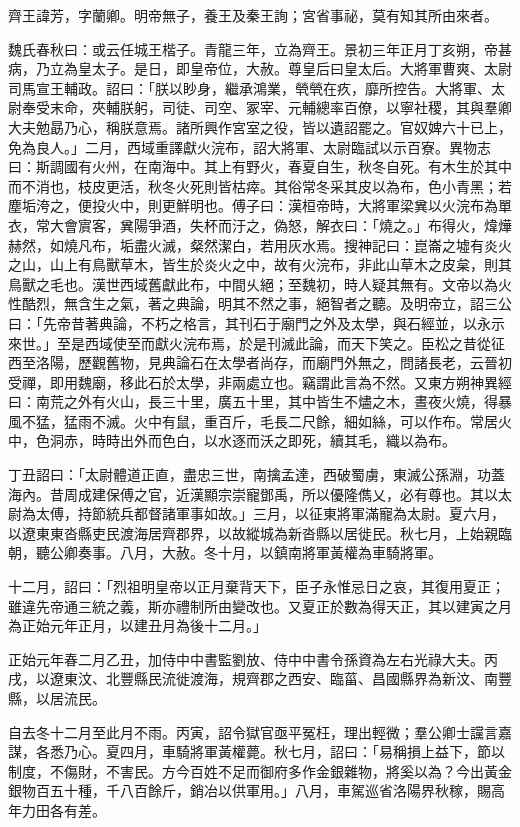 
\begin{pinyinscope}
齊王諱芳，字蘭卿。明帝無子，養王及秦王詢；宮省事祕，莫有知其所由來者。

魏氏春秋曰：或云任城王楷子。青龍三年，立為齊王。景初三年正月丁亥朔，帝甚病，乃立為皇太子。是日，即皇帝位，大赦。尊皇后曰皇太后。大將軍曹爽、太尉司馬宣王輔政。詔曰：「朕以眇身，繼承鴻業，煢煢在疚，靡所控告。大將軍、太尉奉受末命，夾輔朕躬，司徒、司空、冢宰、元輔總率百僚，以寧社稷，其與羣卿大夫勉勗乃心，稱朕意焉。諸所興作宮室之役，皆以遺詔罷之。官奴婢六十已上，免為良人。」二月，西域重譯獻火浣布，詔大將軍、太尉臨試以示百寮。異物志曰：斯調國有火州，在南海中。其上有野火，春夏自生，秋冬自死。有木生於其中而不消也，枝皮更活，秋冬火死則皆枯瘁。其俗常冬采其皮以為布，色小青黑；若塵垢洿之，便投火中，則更鮮明也。傅子曰：漢桓帝時，大將軍梁兾以火浣布為單衣，常大會賔客，兾陽爭酒，失杯而汙之，偽怒，解衣曰：「燒之。」布得火，煒燁赫然，如燒凡布，垢盡火滅，粲然潔白，若用灰水焉。搜神記曰：崑崙之墟有炎火之山，山上有鳥獸草木，皆生於炎火之中，故有火浣布，非此山草木之皮枲，則其鳥獸之毛也。漢世西域舊獻此布，中間乆絕；至魏初，時人疑其無有。文帝以為火性酷烈，無含生之氣，著之典論，明其不然之事，絕智者之聽。及明帝立，詔三公曰：「先帝昔著典論，不朽之格言，其刊石于廟門之外及太學，與石經並，以永示來世。」至是西域使至而獻火浣布焉，於是刊滅此論，而天下笑之。臣松之昔從征西至洛陽，歷觀舊物，見典論石在太學者尚存，而廟門外無之，問諸長老，云晉初受禪，即用魏廟，移此石於太學，非兩處立也。竊謂此言為不然。又東方朔神異經曰：南荒之外有火山，長三十里，廣五十里，其中皆生不燼之木，晝夜火燒，得暴風不猛，猛雨不滅。火中有鼠，重百斤，毛長二尺餘，細如絲，可以作布。常居火中，色洞赤，時時出外而色白，以水逐而沃之即死，續其毛，織以為布。

丁丑詔曰：「太尉體道正直，盡忠三世，南擒孟達，西破蜀虜，東滅公孫淵，功蓋海內。昔周成建保傅之官，近漢顯宗崇寵鄧禹，所以優隆儁乂，必有尊也。其以太尉為太傅，持節統兵都督諸軍事如故。」三月，以征東將軍滿寵為太尉。夏六月，以遼東東沓縣吏民渡海居齊郡界，以故縱城為新沓縣以居徙民。秋七月，上始親臨朝，聽公卿奏事。八月，大赦。冬十月，以鎮南將軍黃權為車騎將軍。

十二月，詔曰：「烈祖明皇帝以正月棄背天下，臣子永惟忌日之哀，其復用夏正；雖違先帝通三統之義，斯亦禮制所由變改也。又夏正於數為得天正，其以建寅之月為正始元年正月，以建丑月為後十二月。」

正始元年春二月乙丑，加侍中中書監劉放、侍中中書令孫資為左右光祿大夫。丙戌，以遼東汶、北豐縣民流徙渡海，規齊郡之西安、臨菑、昌國縣界為新汶、南豐縣，以居流民。

自去冬十二月至此月不雨。丙寅，詔令獄官亟平冤枉，理出輕微；羣公卿士讜言嘉謀，各悉乃心。夏四月，車騎將軍黃權薨。秋七月，詔曰：「易稱損上益下，節以制度，不傷財，不害民。方今百姓不足而御府多作金銀雜物，將奚以為？今出黃金銀物百五十種，千八百餘斤，銷冶以供軍用。」八月，車駕巡省洛陽界秋稼，賜高年力田各有差。


\end{pinyinscope}
